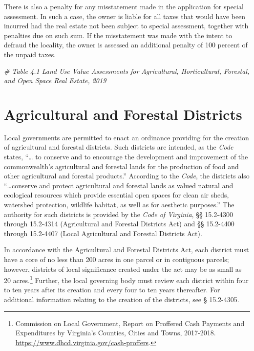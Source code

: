 \documentclass[
]{book}
\newenvironment{Shaded}{\begin{snugshade}}{\end{snugshade}}
\newcommand{\CommentTok}[1]{\textcolor[rgb]{0.56,0.35,0.01}{\textit{#1}}}
\begin{document}
There is also a penalty for any misstatement made in the application for special assessment. In such a case, the owner is liable for all taxes that would have been incurred had the real estate not been subject to special assessment, together with penalties due on such sum. If the misstatement was made with the intent to defraud the locality, the owner is assessed an additional penalty of 100 percent of the unpaid taxes.

\begin{Shaded}
\begin{Highlighting}[]
\CommentTok{\# Table 4.1 Land Use Value Assessments for Agricultural, Horticultural, Forestal, and Open Space Real Estate, 2019}
\end{Highlighting}
\end{Shaded}

\hypertarget{agricultural-and-forestal-districts}{%
\chapter{Agricultural and Forestal Districts}\label{agricultural-and-forestal-districts}}

Local governments are permitted to enact an ordinance providing for the creation of agricultural and forestal districts. Such districts are intended, as the \emph{Code} states, ``\ldots{} to conserve and to encourage the development and improvement of the commonwealth's agricultural and forestal lands for the production of food and other agricultural and forestal products.'' According to the \emph{Code}, the districts also ``\ldots conserve and protect agricultural and forestal lands as valued natural and ecological resources which provide essential open spaces for clean air sheds, watershed protection, wildlife habitat, as well as for aesthetic purposes.'' The authority for such districts is provided by the \emph{Code of Virginia}, §§ 15.2-4300 through 15.2-4314 (Agricultural and Forestal Districts Act) and §§ 15.2-4400 through 15.2-4407 (Local Agricultural and Forestal Districts Act).

In accordance with the Agricultural and Forestal Districts Act, each district must have a core of no less than 200 acres in one parcel or in contiguous parcels; however, districts of local significance created under the act may be as small as 20 acres.\footnote{Commission on Local Government, Report on Proffered Cash Payments and Expenditures by Virginia's Counties, Cities and Towns, 2017-2018. \url{https://www.dhcd.virginia.gov/cash-proffers}.} Further, the local governing body must review each district within four to ten years after its creation and every four to ten years thereafter. For additional information relating to the creation of the districts, see § 15.2-4305.
\end{document}

